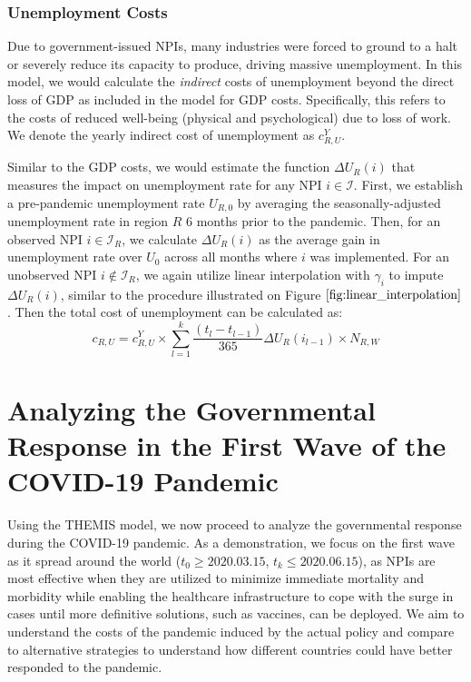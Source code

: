 \documentclass[msom,blindrev]{informs3} %
\begin{document}
\subsubsection*{Unemployment Costs}
Due to government-issued NPIs, many industries were forced to ground to a halt or severely reduce its capacity to produce, driving massive unemployment. In this model, we would calculate the \emph{indirect} costs of unemployment beyond the direct loss of GDP as included in the model for GDP costs. Specifically, this refers to the costs of reduced well-being (physical and psychological) due to loss of work. We denote the yearly indirect cost of unemployment as $c_{R,U}^Y$. 

Similar to the GDP costs, we would estimate the function $\Delta U_R(i)$ that measures the impact on unemployment rate for any NPI $i \in \mathcal{I}$. First, we establish a pre-pandemic unemployment rate $U_{R,0}$ by averaging the seasonally-adjusted unemployment rate in region $R$ 6 months prior to the pandemic. Then, for an observed NPI $i \in \mathcal{I}_R$, we calculate $\Delta U_R(i)$ as the average gain in unemployment rate over $U_0$ across all months where $i$ was implemented. For an unobserved NPI $i \not \in \mathcal{I}_R$, we again utilize linear interpolation with $\gamma_i$ to impute $\Delta U_R(i)$, similar to the procedure illustrated on Figure $\ref{fig:linear_interpolation}$. Then the total cost of unemployment can be calculated as:
\begin{equation}
    c_{R,U}= c_{R,U}^Y \times \sum_{l=1}^k \frac{(t_l-t_{l-1})}{365} \Delta U_R(i_{l-1}) \times N_{R,W}
\end{equation}
\section{Analyzing the Governmental Response in the First Wave of the COVID-19 Pandemic}
\label{sec:experiment}
Using the THEMIS model, we now proceed to analyze the governmental response during the COVID-19 pandemic. As a demonstration, we focus on the first wave as it spread around the world ($t_0\geq  2020.03.15$, $t_k\leq 2020.06.15$), as NPIs are most effective when they are utilized to minimize immediate mortality and morbidity while enabling the healthcare infrastructure to cope with the surge in cases until more definitive solutions, such as vaccines, can be deployed.  We aim to understand the costs of the pandemic induced by the actual policy and compare to alternative strategies to understand how different countries could have better responded to the pandemic. 
\end{document}
